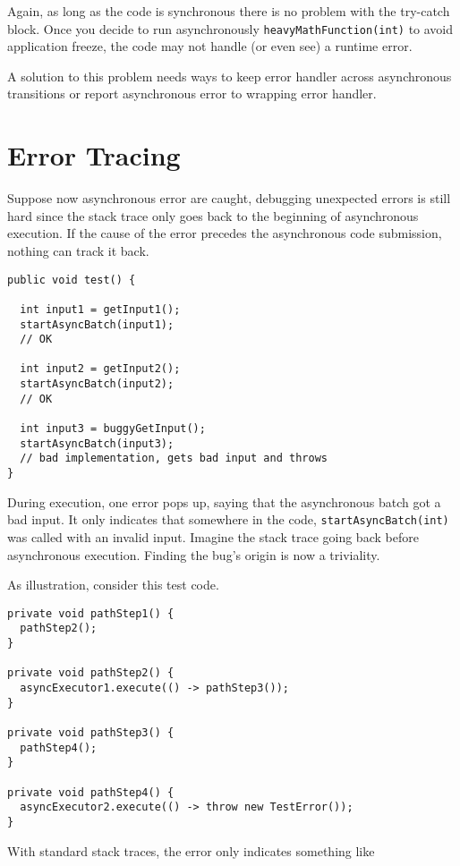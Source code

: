 Again, as long as the code is synchronous there is no problem with the try-catch block. Once you decide to run asynchronously \lstinline{heavyMathFunction(int)} to avoid application freeze, the code may not handle (or even see) a runtime error.

A solution to this problem needs ways to keep error handler across asynchronous transitions or report asynchronous error to wrapping error handler.

\section{Error Tracing}

Suppose now asynchronous error are caught, debugging unexpected errors is still hard since the stack trace only goes back to the beginning of asynchronous execution. If the cause of the error precedes the asynchronous code submission, nothing can track it back.

\begin{lstlisting}
public void test() {

  int input1 = getInput1();
  startAsyncBatch(input1);
  // OK

  int input2 = getInput2();
  startAsyncBatch(input2);
  // OK

  int input3 = buggyGetInput();
  startAsyncBatch(input3);
  // bad implementation, gets bad input and throws
}
\end{lstlisting}

During execution, one error pops up, saying that the asynchronous batch got a bad input. It only indicates that somewhere in the code, \lstinline{startAsyncBatch(int)} was called with an invalid input. Imagine the stack trace going back before asynchronous execution. Finding the bug's origin is now a triviality. 

As illustration, consider this test code.

\begin{lstlisting}
private void pathStep1() {
  pathStep2();
}

private void pathStep2() {
  asyncExecutor1.execute(() -> pathStep3());
}

private void pathStep3() {
  pathStep4();
}

private void pathStep4() {
  asyncExecutor2.execute(() -> throw new TestError());
}
\end{lstlisting}

With standard stack traces, the error only indicates something like

